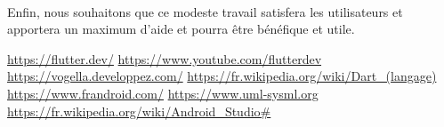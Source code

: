 \documentclass[12pt, openany]{report}
\begin{document}
\paragraph{}Enfin, nous souhaitons que ce modeste travail satisfera les utilisateurs et apportera un maximum d’aide et pourra être bénéfique et utile. 

\begin{thebibliography}{...}

		\bibitem[1]{} \url{https://flutter.dev/}
		\bibitem[2]{} \url{https://www.youtube.com/flutterdev}
		\bibitem[3]{} \url{https://vogella.developpez.com/} 
		\bibitem[4]{} \url{https://fr.wikipedia.org/wiki/Dart_(langage)} 
		\bibitem[5]{} \url{https://www.frandroid.com/}
		\bibitem[6]{} \url{https://www.uml-sysml.org}
		\bibitem[7]{} \url{https://fr.wikipedia.org/wiki/Android_Studio#}
		
\end{thebibliography}

	

 
\end{document}
